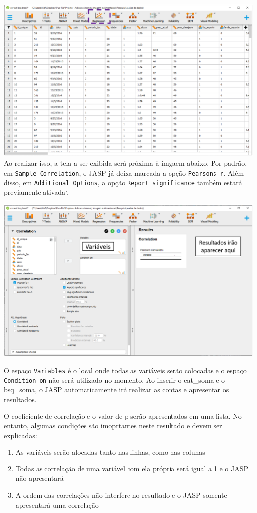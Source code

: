 \documentclass[
]{book}
\providecommand{\tightlist}{%
  \setlength{\itemsep}{0pt}\setlength{\parskip}{0pt}}
\begin{document}
\includegraphics{./img/cap_correlacao_interface.png} Ao realizar isso, a
tela a ser exibida será próxima à imgaem abaixo. Por padrão, em
\texttt{Sample\ Correlation}, o JASP já deixa marcada a opção
\texttt{Pearson\textquotesingle{}s\ r}. Além disso, em
\texttt{Additional\ Options}, a opção \texttt{Report\ significance}
também estará previamente ativada`.

\includegraphics{./img/cap_correlacao_interface2.png}

O espaço \texttt{Variables} é o local onde todas as variáveis serão
colocadas e o espaço \texttt{Condition\ on} não será utilizado no
momento. Ao inserir o eat\_soma e o bsq\_soma, o JASP automaticamente
irá realizar as contas e apresentar os resultados.

O coeficiente de correlação e o valor de p serão apresentados em uma
lista. No entanto, algumas condições são imoprtantes neste resultado e
devem ser explicadas:

\begin{enumerate}
\def\labelenumi{\arabic{enumi}.}
\tightlist
\item
  As variáveis serão alocadas tanto nas linhas, como nas colunas\\
\item
  Todas as correlação de uma variável com ela própria será igual a 1 e o
  JASP não apresentará\\
\item
  A ordem das correlações não interfere no resultado e o JASP somente
  apresentará uma correlação
\end{enumerate}
\end{document}

